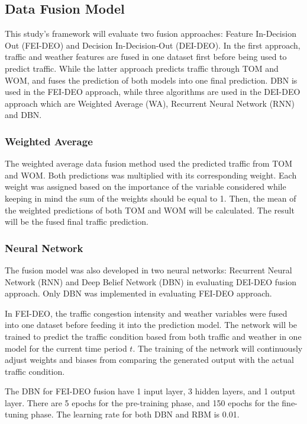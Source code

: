 \subsection{Data Fusion Model}
This study’s framework will evaluate two fusion approaches: Feature In-Decision Out (FEI-DEO) and Decision In-Decision-Out (DEI-DEO). In the first approach, traffic and weather features are fused in one dataset first before being used to predict traffic. While the latter approach predicts traffic through TOM and WOM, and fuses the prediction of both models into one final prediction. DBN is used in the FEI-DEO approach, while three algorithms are used in the DEI-DEO approach which are Weighted Average (WA), Recurrent Neural Network (RNN) and DBN. 


\subsubsection{Weighted Average} 
The weighted average data fusion method used the predicted traffic from TOM and WOM. Both predictions was multiplied with its corresponding weight. Each weight was assigned based on the importance of the variable considered while keeping in mind the sum of the weights should be equal to 1. Then, the mean of the weighted predictions of both TOM and WOM will be calculated. The result will be the fused final traffic prediction.


\subsubsection{Neural Network}
The fusion model was also developed in two neural networks: Recurrent Neural Network (RNN) and Deep Belief Network (DBN) in evaluating DEI-DEO fusion approach. Only DBN was implemented in evaluating FEI-DEO approach.

In FEI-DEO, the traffic congestion intensity and weather variables were fused into one dataset before feeding it into the prediction model. The network will be trained to predict the traffic condition based from both traffic and weather in one model for the current time period $t$. The training of the network will continuously adjust weights and biases from comparing the generated output with the actual traffic condition. 

The DBN for FEI-DEO fusion have 1 input layer, 3 hidden layers, and 1 output layer. There are 5 epochs for the pre-training phase, and 150 epochs for the fine-tuning phase. The learning rate for both DBN and RBM is 0.01. 

